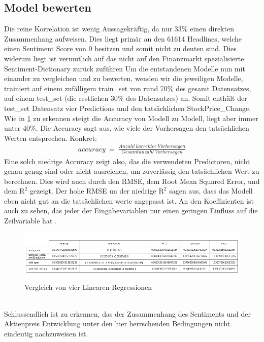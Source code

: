 \subsection{Model bewerten}
Die reine Korrelation ist wenig Aussagekräftig, da nur 33\% einen direkten Zusammenhang aufweisen. Dies liegt primär an den 61614 Headlines, welche einen Sentiment Score von 0 besitzen und somit nicht zu deuten sind. Dies widerum liegt ist vermutlich auf das nicht auf den Finanzmarkt spezialisierte Sentiment-Dictionary zurück zuführen \citep{ronenFeldman2013}
Um die entstandenen Modelle nun mit einander zu vergleichen und zu bewerten, wenden wir die jeweiligen Modelle, trainiert auf einem zufälligem train\_set von rund 70\% des gesamt Datensatzes, auf einem test\_set (die restlichen 30\% des Datensatzes) an. Somit enthält der test\_set Datensatz vier Predictions und den tatsächlichen StockPrice\_Change.\\
Wie in \ref{evaluationSentiment} zu erkennen steigt die Accuracy von Modell zu Modell, liegt aber immer unter 40\%. Die Accuracy sagt aus, wie viele der Vorhersagen den tatsächlichen Werten entsprechen. Konkret: 
\begin{align}
    accuracy\: { = }\: \frac{Anzahl\:korrekter\:Vorhersagen}{Gesamtanzahl\:Vorhersagen}
    \label{TF Formel}
\end{align}
Eine solch niedrige Accuracy zeigt also, das die verwendeten Predictoren, nicht genau genug sind oder nicht ausreichen, um zuverlässig den tatsächlichen Wert zu berechnen. Dies wird auch durch den RMSE, dem Root Mean Squared Error, und dem $\text{R}^2$ gezeigt. Der hohe RMSE un der niedrige $\text{R}^2$ sagen aus, dass das Modell eben nicht gut an die tatsächlichen werte angepasst ist. An den Koeffizienten ist auch zu sehen, das jeder der Eingabevariablen nur einen geringen Einfluss auf die Zeilvariable hat \citep{uyanik_gueler2013}.
\begin{figure}[b]
    \includegraphics[width=1\textwidth]{img/evaluation_sentiment_Modelling.png}
    \caption{Vergleich von vier Linearen Regressionen}
    \label{evaluationSentiment}
\end{figure}
\\Schlussendlich ist zu erkennen, das der Zusammenhang des Sentiments und der Aktienpreis Entwicklung unter den hier herrschenden Bedingungen nicht eindeutig nachzuweisen ist.

